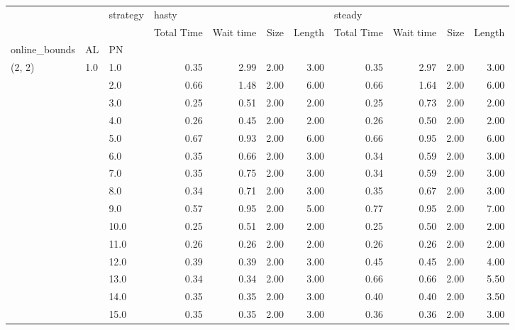 \begin{tabular}{lllrrrrrrrr}
\toprule
       &     & strategy & \multicolumn{4}{l}{hasty} & \multicolumn{4}{l}{steady} \\
       &     & {} & Total Time & Wait time & Size & Length & Total Time & Wait time & Size & Length \\
online\_bounds & AL & PN &            &           &      &        &            &           &      &        \\
\midrule
(2, 2) & 1.0 & 1.0  &       0.35 &      2.99 & 2.00 &   3.00 &       0.35 &      2.97 & 2.00 &   3.00 \\
       &     & 2.0  &       0.66 &      1.48 & 2.00 &   6.00 &       0.66 &      1.64 & 2.00 &   6.00 \\
       &     & 3.0  &       0.25 &      0.51 & 2.00 &   2.00 &       0.25 &      0.73 & 2.00 &   2.00 \\
       &     & 4.0  &       0.26 &      0.45 & 2.00 &   2.00 &       0.26 &      0.50 & 2.00 &   2.00 \\
       &     & 5.0  &       0.67 &      0.93 & 2.00 &   6.00 &       0.66 &      0.95 & 2.00 &   6.00 \\
       &     & 6.0  &       0.35 &      0.66 & 2.00 &   3.00 &       0.34 &      0.59 & 2.00 &   3.00 \\
       &     & 7.0  &       0.35 &      0.75 & 2.00 &   3.00 &       0.34 &      0.59 & 2.00 &   3.00 \\
       &     & 8.0  &       0.34 &      0.71 & 2.00 &   3.00 &       0.35 &      0.67 & 2.00 &   3.00 \\
       &     & 9.0  &       0.57 &      0.95 & 2.00 &   5.00 &       0.77 &      0.95 & 2.00 &   7.00 \\
       &     & 10.0 &       0.25 &      0.51 & 2.00 &   2.00 &       0.25 &      0.50 & 2.00 &   2.00 \\
       &     & 11.0 &       0.26 &      0.26 & 2.00 &   2.00 &       0.26 &      0.26 & 2.00 &   2.00 \\
       &     & 12.0 &       0.39 &      0.39 & 2.00 &   3.00 &       0.45 &      0.45 & 2.00 &   4.00 \\
       &     & 13.0 &       0.34 &      0.34 & 2.00 &   3.00 &       0.66 &      0.66 & 2.00 &   5.50 \\
       &     & 14.0 &       0.35 &      0.35 & 2.00 &   3.00 &       0.40 &      0.40 & 2.00 &   3.50 \\
       &     & 15.0 &       0.35 &      0.35 & 2.00 &   3.00 &       0.36 &      0.36 & 2.00 &   3.00 \\

\end{tabular}
